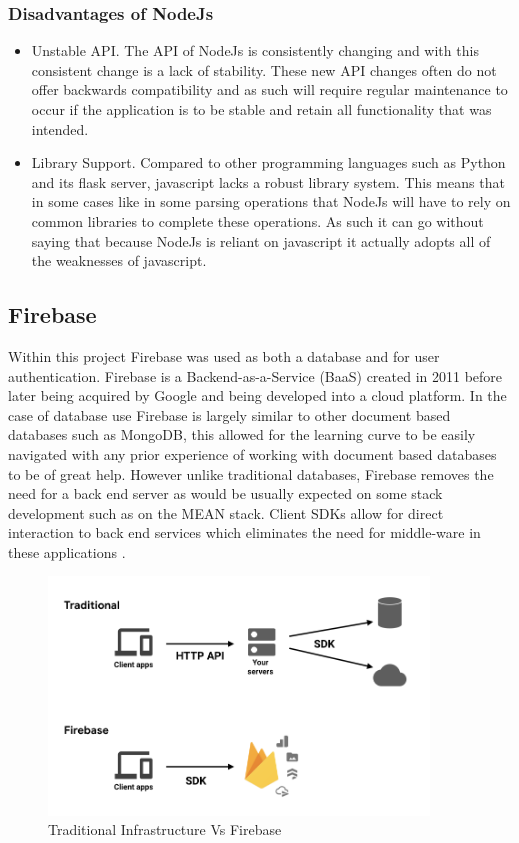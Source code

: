 \subsubsection{Disadvantages of NodeJs}
\begin{itemize}
    \item Unstable API. The API of NodeJs is consistently changing and with this consistent change is a lack of stability. These new API changes often do not offer backwards compatibility and as such will require regular maintenance to occur if the application is to be stable and retain all functionality that was intended.
    \item Library Support. Compared to other programming languages such as Python and its flask server, javascript lacks a robust library system. This means that in some cases like in some parsing operations that NodeJs will have to rely on common libraries to complete these operations. As such it can go without saying that because NodeJs is reliant on javascript it actually adopts all of the weaknesses of javascript.
\end{itemize}

\subsection{Firebase} 
Within this project Firebase was used as both a database and for user authentication. Firebase is a Backend-as-a-Service (BaaS) created in 2011 before later being acquired by Google and being developed into a cloud platform. In the case of database use Firebase is largely similar to other document based databases such as MongoDB, this allowed for the learning curve to be easily navigated with any prior experience of working with document based databases to be of great help. However unlike traditional databases, Firebase removes the need for a back end server as would be usually expected on some stack development such as on the MEAN stack. Client SDKs allow for direct interaction to back end services which eliminates the need for middle-ware in these applications \cite{firebase}. \\
\begin{figure}[h!]
    	\caption{Traditional Infrastructure Vs Firebase}
	\centering
	\includegraphics[width=0.9\textwidth]{images/firebase.png}
\end{figure}

